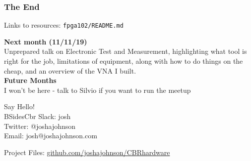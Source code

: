 \documentclass[t]{beamer}
\begin{document}

\begin{frame}
\frametitle{The End}
Links to resources: \texttt{fpga102/README.md}
\vspace{5mm}

\textbf{Next month (11/11/19)}\\
Unprepared talk on Electronic Test and Measurement, highlighting what tool is right for the job, limitations of equipment, along with how to do things on the cheap, and an overview of the VNA I built.\\[5pt]

\textbf{Future Months}\\
I won't be here - talk to Silvio if you want to run the meetup


\vspace{10mm}
Say Hello! \\
BSidesCbr Slack: josh\\
Twitter:  @\textunderscore joshajohnson\\
Email: josh@joshajohnson.com\\
\vspace{4mm}

Project Files: \url{github.com/joshajohnson/CBRhardware}\\
\end{frame}
\end{document}
